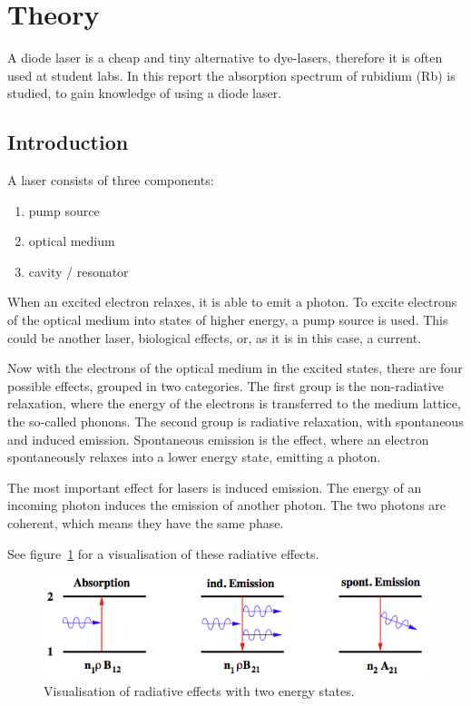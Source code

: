 \section{Theory}\label{theory}

A diode laser is a cheap and tiny alternative to dye-lasers, therefore it is often used at student
labs.
In this report the absorption spectrum of rubidium (Rb) is studied, to gain knowledge of using
a diode laser.

\subsection{Introduction}\label{introduction}

A laser consists of three components:

\begin{enumerate}
  \item pump source
  \item optical medium
  \item cavity / resonator
\end{enumerate}

When an excited electron relaxes, it is able to emit a photon.
To excite electrons of the optical medium into states of higher energy, a pump source is used.
This could be another laser, biological effects, or, as it is in this case, a current.

Now with the electrons of the optical medium in the excited states, there are four possible
effects, grouped in two categories.
The first group is the non-radiative relaxation, where the energy of the electrons is transferred
to the medium lattice, the so-called phonons.
The second group is radiative relaxation, with spontaneous and induced emission.
Spontaneous emission is the effect, where an electron spontaneously relaxes into a lower energy
state, emitting a photon.

The most important effect for lasers is induced emission.
The energy of an incoming photon induces the emission of another photon.
The two photons are coherent, which means they have the same phase.

See figure~\ref{fig:two_niveau_laser} for a visualisation of these radiative effects.
\begin{figure}[ht]
  \centering
  \includegraphics[width=0.8\linewidth]{content/zweiniveausystem.png}
  \caption{Visualisation of radiative effects with two energy states\cite{anleitung_hene}.}%
  \label{fig:two_niveau_laser}
\end{figure}

